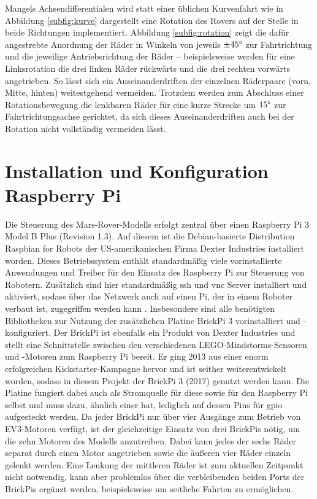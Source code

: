 Mangels Achsendifferentialen wird statt einer üblichen Kurvenfahrt wie in Abbildung \ref{subfig:kurve} dargestellt eine Rotation des Rovers auf der Stelle in beide Richtungen implementiert.
Abbildung \ref{subfig:rotation} zeigt die dafür angestrebte Anordnung der Räder in Winkeln von jeweils $\pm45\degree$ zur Fahrtrichtung und die jeweilige Antriebsrichtung der Räder -- beispielsweise werden für eine Linksrotation die drei linken Räder rückwärts und die drei rechten vorwärts angetrieben.
So lässt sich ein Auseinanderdriften der einzelnen Räderpaare (vorn, Mitte, hinten) weitestgehend vermeiden.
Trotzdem werden zum Abschluss einer Rotationsbewegung die lenkbaren Räder für eine kurze Strecke um $15\degree$ zur Fahrtrichtungsachse gerichtet, da sich dieses Auseinanderdriften auch bei der Rotation nicht vollständig vermeiden lässt.

\section{Installation und Konfiguration Raspberry Pi}
\label{sec:inst_konf_raspi}

Die Steuerung des Mars-Rover-Modells erfolgt zentral über einen Raspberry Pi 3 Model B Plus (Revision 1.3).
Auf diesem ist die Debian-basierte Distribution Raspbian for Robots der US-amerikanischen Firma Dexter Industries installiert worden.
Dieses Betriebssystem enthält standardmäßig viele vorinstallierte Anwendungen und Treiber für den Einsatz des Raspberry Pi zur Steuerung von Robotern.
Zusätzlich sind hier standardmäßig \acf{ssh} und \acf{vnc} Server installiert und aktiviert, sodass über das Netzwerk auch auf einen Pi, der in einem Roboter verbaut ist, zugegriffen werden kann \cite{donat2018, mcmanus2017}.
Insbesondere sind alle benötigten Bibliotheken zur Nutzung der zusätzlichen Platine BrickPi 3 vorinstalliert und -konfiguriert.
Der BrickPi ist ebenfalls ein Produkt von Dexter Industries und stellt eine Schnittstelle zwischen den verschiedenen LEGO-Mindstorms-Sensoren und -Motoren zum Raspberry Pi bereit.
Er ging 2013 aus einer enorm erfolgreichen Kickstarter-Kampagne hervor \cite{barnes2015} und ist seither weiterentwickelt worden, sodass in diesem Projekt der BrickPi 3 (2017) genutzt werden kann.
Die Platine fungiert dabei auch als Stromquelle für diese sowie für den Raspberry Pi selbst und muss dazu, ähnlich einer \acf{hat}, lediglich auf dessen Pins für \acf{gpio} aufgesteckt werden.
Da jeder BrickPi nur über vier Ausgänge zum Betrieb von EV3-Motoren verfügt, ist der gleichzeitige Einsatz von drei BrickPis nötig, um die zehn Motoren des Modells anzutreiben.
Dabei kann jedes der sechs Räder separat durch einen Motor angetrieben sowie die äußeren vier Räder einzeln gelenkt werden.
Eine Lenkung der mittleren Räder ist zum aktuellen Zeitpunkt nicht notwendig, kann aber problemlos über die verbleibenden beiden Ports der BrickPis ergänzt werden, beispielsweise um seitliche Fahrten zu ermöglichen.

